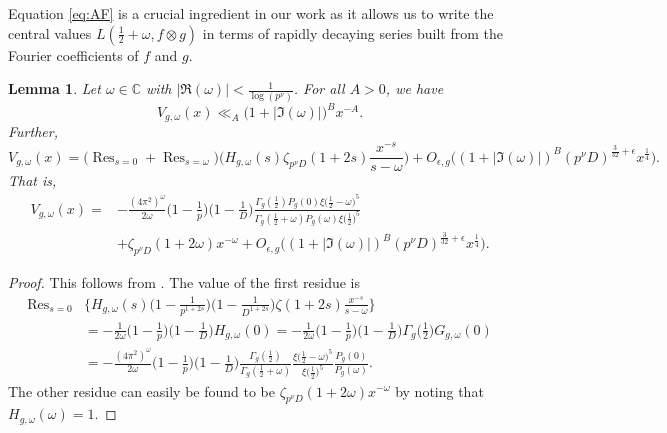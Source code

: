 \documentclass[12pt]{amsart}
\theoremstyle{plain}
\newtheorem{lem}{Lemma}[subsection]
\theoremstyle{definition}
\begin{document}
Equation \eqref{eq:AF} is a crucial ingredient in our work as it allows us to write the central values $L\left(\frac12+\omega,f\otimes g\right)$ in terms of  rapidly decaying series built from the Fourier coefficients of $f$ and $g$. 
\begin{lem}\label{V bounds}
Let $\omega\in\mathbb{C}$ with $|\Re(\omega)| < \frac{1}{\log(p^\nu)}$. For all $A>0$, we have
    \[
    V_{g, \omega}(x) \ll_A \big(1+|\Im(\omega)|\big)^B x^{-A}.
    \]
Further,
    \[
    V_{g, \omega}(x)
    =    \big(\mathop{\mathrm{Res}}_{s=0}+\mathop{\mathrm{Res}}_{s=\omega}\big) 
    \bigg(H_{g,\omega}(s)  \zeta_{p^\nu D} (1+2s) \frac{x^{-s}}{s-\omega} \bigg)
    + O_{\epsilon, g}\Big((1+|\Im(\omega)|)^B (p^\nu D)^{\frac{3}{32}+\epsilon} x^{\frac14}\Big).
    \]
That is,
        \begin{align*}
    V_{g, \omega}(x)
    =&  
    -\frac{(4\pi^2)^{\omega}} {2\omega} \Big(1-\frac1{p}\Big)  \Big(1-\frac1{D}\Big) \frac{\Gamma_g\left(\frac12\right)P_g(0) \xi\big(\frac12-\omega\big)^5}{\Gamma_g\left(\frac12+\omega\right)P_g(\omega)
    \xi\big(\frac12\big)^5} 
    \\
    &+ \zeta_{p^\nu D} (1+2\omega) x^{-\omega}
    + O_{\epsilon, g}\Big((1+|\Im(\omega)|)^B (p^\nu D)^{\frac{3}{32}+\epsilon} x^{\frac14}\Big). 
    \end{align*}
\end{lem}


\begin{proof}
This follows from \cite[Eq.~4.12, Eq.~4.14]{KMV RS}. The value of the first residue is
    \begin{align*}
     \mathop{\mathrm{Res}}_{s=0}
    & \bigg\{H_{g,\omega}(s) \Big(1-\frac{1}{p^{1+2s}}\Big) \Big(1-\frac{1}{D^{1+2s}}\Big) \zeta(1+2s) \frac{x^{-s}}{s-\omega} \bigg\} 
    \\
    &=
     -\frac{1}{2\omega}\Big(1-\frac1{p}\Big) \Big(1-\frac1{D}\Big) H_{g,\omega}(0) 
    = -\frac{1}{2\omega} \Big(1-\frac1{p}\Big)  \Big(1-\frac1{D}\Big) \Gamma_g\Big(\frac12\Big) G_{g, \omega}(0)
    \\
    & = -
    \frac{(4\pi^2)^{\omega}} {2\omega} \Big(1-\frac1{p}\Big) \Big(1-\frac1{D}\Big) \frac{\Gamma_g\left(\frac12\right)}{\Gamma_g\left(\frac12+\omega\right)}
    \frac{\xi\big(\frac12-\omega\big)^5}{\xi\big(\frac12\big)^5} \frac{P_g(0)}{P_g(\omega)} .
    \end{align*}
The other residue can easily be found to be $\zeta_{p^\nu D}(1+2\omega)x^{-\omega}$ by noting that $H_{g,\omega}(\omega)=1$.
\end{proof}
\end{document}
